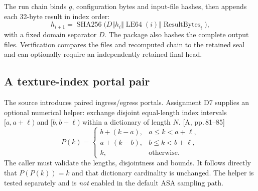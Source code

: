 \documentclass[11pt,a4paper]{article}
\newcommand{\src}[1]{\textcolor{muted}{[A, #1]}}
\newcommand{\SHA}{\operatorname{SHA256}}
\begin{document}
The run chain binds $g$, configuration bytes and input-file hashes, then appends each 32-byte result in index order:
\begin{equation}
h_{i+1}=\SHA\bigl(D\Vert h_i\Vert\operatorname{LE64}(i)\Vert\operatorname{ResultBytes}_i\bigr),
\end{equation}
with a fixed domain separator $D$. The package also hashes the complete output files. Verification compares the files and recomputed chain to the retained seal and can optionally require an independently retained final head.

\subsection{A texture-index portal pair}
The source introduces paired ingress/egress portals. Assignment D7 supplies an optional numerical helper: exchange disjoint equal-length index intervals $[a,a+\ell)$ and $[b,b+\ell)$ within a dictionary of length $N$. \src{pp.\,81--85}
\begin{equation}
P(k)=\begin{cases}b+(k-a),&a\le k<a+\ell,\\a+(k-b),&b\le k<b+\ell,\\k,&\text{otherwise}.\end{cases}
\end{equation}
The caller must validate the lengths, disjointness and bounds. It follows directly that $P(P(k))=k$ and that dictionary cardinality is unchanged. The helper is tested separately and is \emph{not} enabled in the default ASA sampling path.
\clearpage
\end{document}
